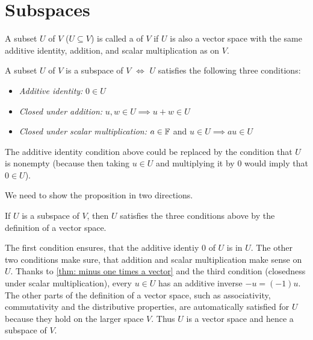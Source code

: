 \section{Subspaces}

\begin{mydef} [subspace]
  A subset $U$ of $V$ ($U \subseteq V$) is called a  of $V$ if $U$ is also a vector space with the same additive identity, addition, and scalar multiplication as on $V$.
\end{mydef}

\begin{thm} 
  \label{thm: conditions for a subspace}
  A subset $U$ of $V$ is a subspace of $V$ $\iff$ $U$ satisfies the following three conditions:
  \begin{itemize}
    \item \emph{Additive identity:}
    $0 \in U$
    \item \emph{Closed under addition:}
    $u,w \in U \implies u+w \in U$
    \item \emph{Closed under scalar multiplication:}
    $a \in \mathbb{F}$ and $u \in U \implies au \in U$
  \end{itemize}
  The additive identity condition above could be replaced by the condition that $U$ is nonempty (because then taking $u \in U$ and multiplying it by $0$ would imply that $0\in U$).
\end{thm}
\begin{prf} We need to show the proposition in two directions.
  \begin{description}
    \item{\Rightarrowdirection} If $U$ is a subspace of $V$, then $U$ satisfies the three conditions above by the definition of a vector space.
    \item{\Leftarrowdirection} The first condition ensures, that the additive identiy $0$ of $U$ is in $U$. The other two conditions make sure, that addition and scalar multiplication make sense on $U$.
    Thanks to \ref{thm: minus one times a vector} and the third condition (closedness under scalar multiplication), every $u \in U$ has an additive inverse $-u = (-1) u$.
    The other parts of the definition of a vector space, such as associativity, commutativity and the distributive properties, are automatically satisfied for $U$ because they hold on the larger space $V$. Thus $U$ is a vector space and hence a subspace of $V$.
  \end{description}
  \vspace*{-\baselineskip}
\end{prf}

